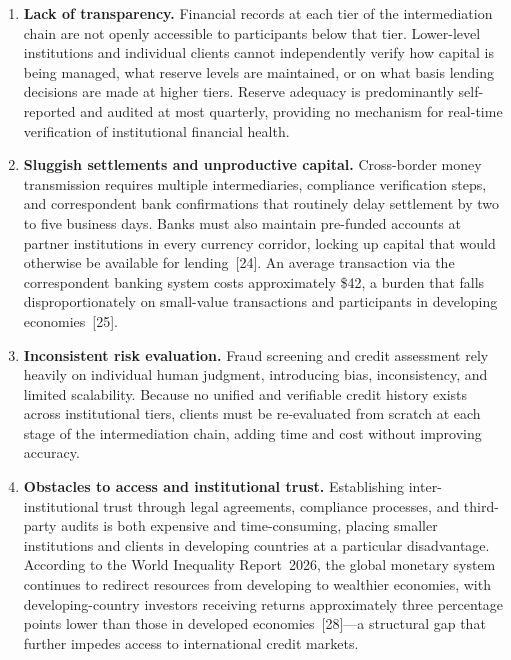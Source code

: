\documentclass[12pt,a4paper]{report}
\begin{document}
\begin{enumerate}[noitemsep]
\item \textbf{Lack of transparency.} Financial records at each tier of the intermediation chain are not openly accessible to participants below that tier. Lower-level institutions and individual clients cannot independently verify how capital is being managed, what reserve levels are maintained, or on what basis lending decisions are made at higher tiers. Reserve adequacy is predominantly self-reported and audited at most quarterly, providing no mechanism for real-time verification of institutional financial health.

\item \textbf{Sluggish settlements and unproductive capital.} Cross-border money transmission requires multiple intermediaries, compliance verification steps, and correspondent bank confirmations that routinely delay settlement by two to five business days. Banks must also maintain pre-funded accounts at partner institutions in every currency corridor, locking up capital that would otherwise be available for lending~[24]. An average transaction via the correspondent banking system costs approximately \$42, a burden that falls disproportionately on small-value transactions and participants in developing economies~[25].

\item \textbf{Inconsistent risk evaluation.} Fraud screening and credit assessment rely heavily on individual human judgment, introducing bias, inconsistency, and limited scalability. Because no unified and verifiable credit history exists across institutional tiers, clients must be re-evaluated from scratch at each stage of the intermediation chain, adding time and cost without improving accuracy.

\item \textbf{Obstacles to access and institutional trust.} Establishing inter-institutional trust through legal agreements, compliance processes, and third-party audits is both expensive and time-consuming, placing smaller institutions and clients in developing countries at a particular disadvantage. According to the World Inequality Report~2026, the global monetary system continues to redirect resources from developing to wealthier economies, with developing-country investors receiving returns approximately three percentage points lower than those in developed economies~[28]---a structural gap that further impedes access to international credit markets.


\end{enumerate}
\end{document}
